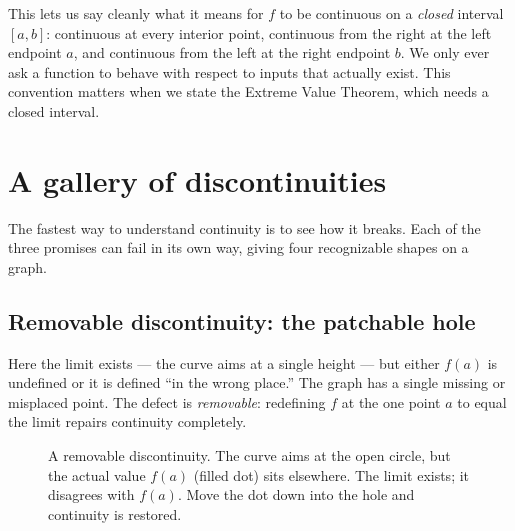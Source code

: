 This lets us say cleanly what it means for $f$ to be continuous on a \emph{closed}
interval $[a,b]$: continuous at every interior point, continuous from the right at the
left endpoint $a$, and continuous from the left at the right endpoint $b$. We only ever
ask a function to behave with respect to inputs that actually exist. This convention
matters when we state the Extreme Value Theorem, which needs a closed interval.

\section{A gallery of discontinuities}
\label{ch08:gallery}

The fastest way to understand continuity is to see how it breaks. Each of the three
promises can fail in its own way, giving four recognizable shapes on a graph.

\subsection{Removable discontinuity: the patchable hole}

Here the limit exists --- the curve aims at a single height --- but either $f(a)$
is undefined or it is defined ``in the wrong place.'' The graph has a single missing or
misplaced point. The defect is \emph{removable}: redefining $f$ at the one point $a$ to
equal the limit repairs continuity completely.

\begin{figure}[htbp]
\centering
{}
\caption{A removable discontinuity. The curve aims at the open circle, but the actual
value $f(a)$ (filled dot) sits elsewhere. The limit exists; it disagrees with
$f(a)$. Move the dot down into the hole and continuity is restored.}
\label{ch08:fig-removable}
\end{figure}

